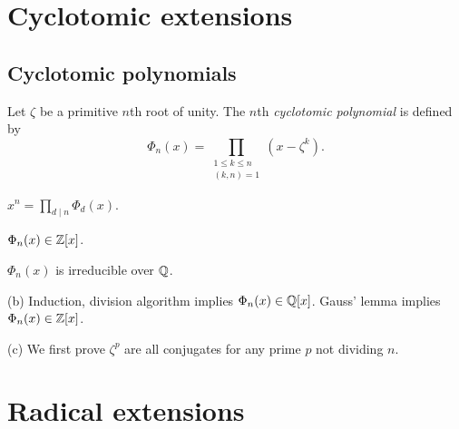 \documentclass{../note}
\begin{document}
\chapter{Cyclotomic extensions}
\section{Cyclotomic polynomials}

\begin{prb}
Let $\zeta$ be a primitive $n$th root of unity.
The $n$th \emph{cyclotomic polynomial} is defined by
\[\Phi_n(x)=\prod_{\substack{1\le k\le n\\(k,n)=1}}(x-\zeta^k).\]
\begin{parts}
\item $x^n=\prod_{d\mid n}\Phi_d(x)$.
\item $\Phi_n(x)\in\mathbb{Z}[x]$.
\item $\Phi_n(x)$ is irreducible over $\mathbb{Q}$.
\end{parts}
\end{prb}
\begin{pf}

(b)
Induction, division algorithm implies $\Phi_n(x)\in\mathbb{Q}[x]$.
Gauss' lemma implies $\Phi_n(x)\in\mathbb{Z}[x]$.

(c)
We first prove $\zeta^p$ are all conjugates for any prime $p$ not dividing $n$.
\end{pf}



\begin{prb}

\end{prb}






\chapter{Radical extensions}
\end{document}
